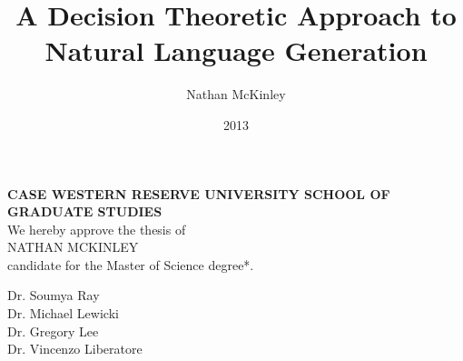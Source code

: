 

\clearpage{}  %



\title{A Decision Theoretic Approach to Natural Language Generation}
\author{Nathan McKinley}
\date{2013}
\thesis
\makeatletter
\renewcommand\@date{January, 2014}
\makeatother
\maketitle

\clearpage
\begin{center}
{\bf CASE WESTERN RESERVE UNIVERSITY
SCHOOL OF GRADUATE STUDIES}\\

We hereby approve the thesis of\\
NATHAN MCKINLEY\\
candidate for the Master of Science degree*.\\
\end{center}
\noindent
Dr. Soumya Ray\\
Dr. Michael Lewicki\\
Dr. Gregory Lee\\
Dr. Vincenzo Liberatore\\

